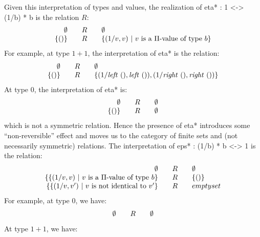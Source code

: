 \documentclass[preprint]{sigplanconf}
\begin{document}
Given this interpretation of types and values, the realization of 
{{eta* : 1 <-> (1/b) * b}} is the relation $R$: 
\[\begin{array}{r@{\qquad}c@{\qquad}l}
\emptyset &R& \emptyset \\
\{ () \} &R& \{ (1/v,v) ~|~ v \mbox{~is~a~} \Pi\mbox{-value~of~type~} b \}
\end{array}\]
For example, at type $1+1$, the interpretation of {{eta*}} is the relation:
\[\begin{array}{r@{\qquad}c@{\qquad}l}
\emptyset &R& \emptyset \\
\{ () \} &R& \{ (1/\mathit{left}~(),\mathit{left}~()), 
                (1/\mathit{right}~(),\mathit{right}~()) \} 
\end{array}\]
At type $0$, the interpretation of {{eta*}} is:
\[\begin{array}{r@{\qquad}c@{\qquad}l}
\emptyset &R& \emptyset \\
\{ () \} &R& \emptyset 
\end{array}\]
which is not a symmetric relation. Hence the presence of {{eta*}} introduces
some ``non-reversible'' effect and moves us to the category of finite sets 
and (not necessarily symmetric) relations. The interpretation of 
{{eps* : (1/b) * b <-> 1}} is the relation:
\[\begin{array}{r@{\qquad}c@{\qquad}l}
\emptyset &R& \emptyset \\
\{ \{ (1/v,v) ~|~ v \mbox{~is~a~} \Pi\mbox{-value~of~type~} b \} &R& \{ () \} \\
\{ \{ (1/v,v') ~|~ v \mbox{~is~not~identical~to~} v' \} &R& emptyset 
\end{array}\]
For example, at type $0$, we have:
\[\begin{array}{r@{\qquad}c@{\qquad}l}
\emptyset &R& \emptyset 
\end{array}\]
At type $1+1$, we have:
\end{document}
